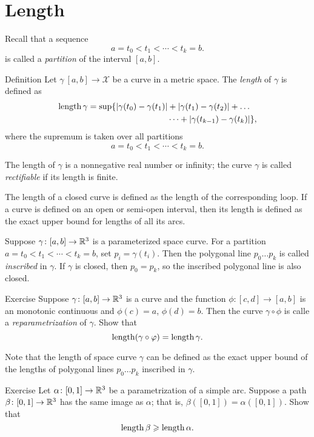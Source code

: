 \chapter{Length}
 
Recall that a sequence 
\[a=t_0 < t_1 < \cdots < t_k=b.\]
is called a \emph{partition} of the interval $[a,b]$.

\begin{thm}{Definition}\label{def:length}
Let $\gamma\:[a,b]\to \mathcal{X}$ be a curve in a metric space.
The \emph{length} of $\gamma$ is defined as
\begin{align*}
\mathop{\rm length}\nolimits \gamma
= 
\sup \{|\gamma(t_0)-\gamma(t_1)|&+|\gamma(t_1)-\gamma(t_2)|+\dots
\\
&\dots+|\gamma(t_{k-1})-\gamma(t_k)|\},
\end{align*}
where the supremum is taken over all partitions
\[a=t_0 < t_1 < \cdots < t_k=b.\]

The length of $\gamma$ is a nonnegative real number or infinity;
the curve $\gamma$ is called \emph{rectifiable} if its length is finite. 

The length of a closed curve is defined as the length of the corresponding loop.
If a curve is defined on an open or semi-open interval, then its length is defined as the exact upper bound for lengths of all its arcs.
\end{thm}

Suppose $\gamma\colon[a,b]\to \mathbb{R}^3$ is a parameterized space curve.
For a partition $a=t_0 < t_1 < \cdots < t_k=b$, set $p_i=\gamma(t_i)$.
Then the polygonal line $p_0\dots p_k$ is called \emph{inscribed} in $\gamma$.
If $\gamma$ is closed, then $p_0=p_k$, so the inscribed polygonal line is also closed.

\begin{thm}{Exercise}\label{ex:integral-length-0}
Suppose $\gamma\colon[a,b] \to\mathbb{R}^3$ is a curve and the function $\phi : [c,d] \to [a,b]$ is an monotonic continuous and $\phi(c)=a$, $\phi(d)=b$.
Then the curve $\gamma \circ \phi$ is calle a 
\emph{reparametrization} of $\gamma$.
Show that 
\[\mathop{\rm length}\nolimits (\gamma \circ \varphi) = \mathop{\rm length}\nolimits \gamma.\]

\end{thm}

Note that the length of space curve $\gamma$ can be defined as the exact upper bound of the lengths of polygonal lines $p_0\dots p_k$ inscribed in $\gamma$.

\begin{thm}{Exercise}\label{ex:length-image}
Let $\alpha\colon[0,1]\to\mathbb{R}^3$ be a parametrization of a simple arc.
Suppose a path $\beta\colon[0,1]\to\mathbb{R}^3$ has the same image as $\alpha$;
that is, $\beta([0,1])=\alpha([0,1])$.
Show that 
\[\mathop{\rm length}\nolimits \beta\geqslant \mathop{\rm length}\nolimits \alpha.\]

\end{thm}

